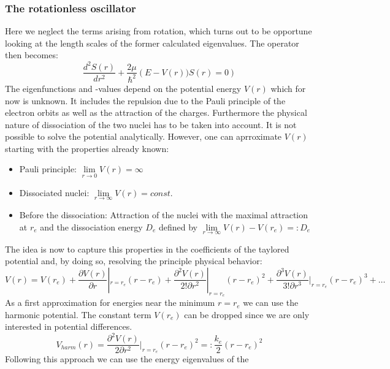 \subsubsection{The rotationless oscillator}
Here we neglect the terms
arising from rotation, which turns out to be opportune looking at the 
length scales of the former calculated eigenvalues.
The operator then becomes:
\begin{equation}
    \frac{d^2 S(r)}{dr^2} + \frac{2\mu}{\hbar^2}
    \left ( E - V(r) )S(r) = 0 \right )
    \label{eqn:V_osc}
\end{equation}
The eigenfunctions and -values depend on the 
potential energy $V(r)$ which for now is unknown. It includes 
the repulsion due to the
Pauli principle of the electron orbits as well as the attraction
of the charges. Furthermore the physical nature of dissociation
of the two nuclei has to be taken into account.
It is not possible to solve the potential analytically. However, 
one can aprroximate $V(r)$ starting with the properties already known:
\begin{itemize}
        \item Pauli principle:
            $\lim\limits_{r \rightarrow 0}{V(r)} = \infty $
        \item Dissociated nuclei:
$\lim\limits_{r \rightarrow \infty}{V(r)} = const. $
\item Before the dissociation: Attraction of the nuclei with
    the maximal attraction at $r_e$ and the dissociation energy
    $D_e$ defined by 
    $ \lim\limits_{r \rightarrow \infty}{V(r)} - V(r_e)=: D_e$ 
\end{itemize}
The idea is now to capture this properties in the coefficients
of the taylored potential and, by doing so, resolving the principle
physical behavior:
\begin{equation}
    V(r) = V(r_e) 
   + \frac{\partial V(r)}{\partial r}|_{r=r_e}(r - r_e)
   + \frac{\partial^2 V(r)}{2!\partial r^2}|_{r=r_e}(r - r_e)^2
   + \frac{\partial^3 V(r)}{3!\partial r^3}|_{r=r_e}(r - r_e)^3
   + \ldots
\end{equation}
As a first approximation for energies near the minimum $r=r_e$ we
can use the harmonic potential. The constant term
$V(r_e)$ can be dropped since we are only interested in 
potential differences.
\begin{equation}
    V_{harm}(r) =
    \frac{\partial^2 V(r)}{2\partial r^2}|_{r=r_e}(r - r_e)^2
    =: \frac{k_e}{2}(r-r_e)^2
\end{equation}
Following this approach we can use the energy eigenvalues of the
